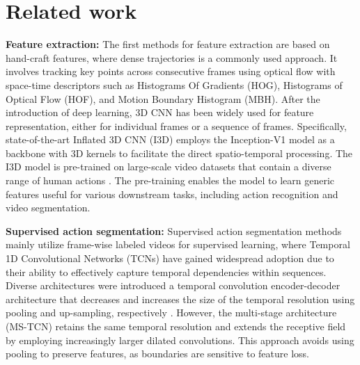 \section{Related work}
\label{section2}




\textbf{Feature extraction:} The first methods for feature extraction are based on hand-craft features, where dense trajectories \cite{wang2011aser, wang2013action} is a commonly used approach. It involves tracking key points across consecutive frames using optical flow with space-time descriptors such as Histograms Of Gradients (HOG), Histograms of Optical Flow (HOF), and Motion Boundary Histogram (MBH). After the introduction of deep learning, 3D CNN has been widely used for feature representation, either for individual frames or a sequence of frames. Specifically, state-of-the-art Inflated 3D CNN (I3D)  \cite{carreira2017quo} employs the Inception-V1 model as a backbone \cite{szegedy2015going} with 3D kernels to facilitate the direct spatio-temporal processing. The I3D model is pre-trained on large-scale video datasets that contain a diverse range of human actions \cite{kay2017kinetics}. The pre-training enables the model to learn generic features useful for various downstream tasks, including action recognition and video segmentation.


\textbf{Supervised action segmentation:} 
Supervised action segmentation methods mainly utilize frame-wise labeled videos for supervised learning, where Temporal 1D Convolutional Networks (TCNs) have gained widespread adoption due to their ability to effectively capture temporal dependencies within sequences. Diverse architectures were introduced a temporal convolution encoder-decoder architecture that decreases and increases the size of the temporal resolution using pooling and up-sampling, respectively \cite{lea2017temporal, ding2018weakly, lei2018temporal,singhania2023c2f}. However, the multi-stage architecture (MS-TCN) retains the same temporal resolution and extends the receptive field by employing increasingly larger dilated convolutions. This approach avoids using pooling to preserve features, as boundaries are sensitive to feature loss. 

